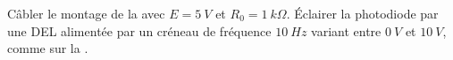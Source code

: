 \begin{protocole}
    \item Câbler le montage de la  avec $E=\SI{5}{V}$ et $R_0=\SI{1}{k\Omega}$. Éclairer la photodiode par une DEL alimentée par un créneau de fréquence $\SI{10}{Hz}$ variant entre $\SI{0}{V}$ et  $\SI{10}{V}$, comme sur la .
    
    \end{protocole}
